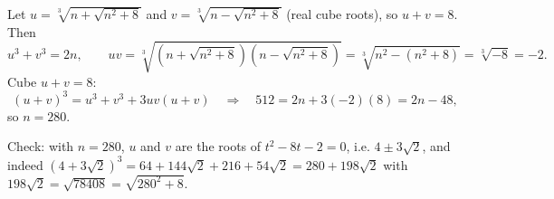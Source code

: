 Let $u=\sqrt[3]{n+\sqrt{n^2+8}}$ and $v=\sqrt[3]{n-\sqrt{n^2+8}}$ (real cube roots), so $u+v=8$. Then
\[
u^3+v^3=2n,\qquad uv=\sqrt[3]{\left(n+\sqrt{n^2+8}\right)\left(n-\sqrt{n^2+8}\right)}=\sqrt[3]{n^2-(n^2+8)}=\sqrt[3]{-8}=-2 .
\]
Cube $u+v=8$:
\[
(u+v)^3=u^3+v^3+3uv(u+v)\quad\Longrightarrow\quad512=2n+3(-2)(8)=2n-48,
\]
so $n=\boxed{280}$.

Check: with $n=280$, $u$ and $v$ are the roots of $t^2-8t-2=0$, i.e. $4\pm3\sqrt2$, and indeed $(4+3\sqrt2)^3=64+144\sqrt2+216+54\sqrt2=280+198\sqrt2$ with $198\sqrt2=\sqrt{78408}=\sqrt{280^2+8}$.
